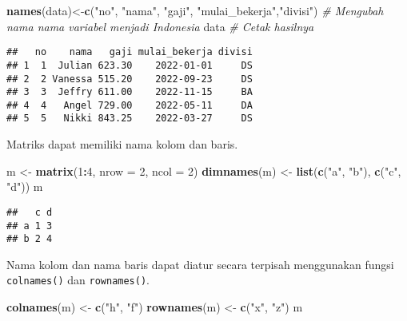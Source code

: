 \documentclass[
]{book}
\newenvironment{Shaded}{\begin{snugshade}}{\end{snugshade}}
\newcommand{\CommentTok}[1]{\textcolor[rgb]{0.56,0.35,0.01}{\textit{#1}}}
\newcommand{\DataTypeTok}[1]{\textcolor[rgb]{0.13,0.29,0.53}{#1}}
\newcommand{\DecValTok}[1]{\textcolor[rgb]{0.00,0.00,0.81}{#1}}
\newcommand{\KeywordTok}[1]{\textcolor[rgb]{0.13,0.29,0.53}{\textbf{#1}}}
\newcommand{\NormalTok}[1]{#1}
\newcommand{\OperatorTok}[1]{\textcolor[rgb]{0.81,0.36,0.00}{\textbf{#1}}}
\newcommand{\StringTok}[1]{\textcolor[rgb]{0.31,0.60,0.02}{#1}}
\begin{document}
\begin{Shaded}
\begin{Highlighting}[]
\KeywordTok{names}\NormalTok{(data)<-}\KeywordTok{c}\NormalTok{(}\StringTok{"no"}\NormalTok{, }\StringTok{"nama"}\NormalTok{, }\StringTok{"gaji"}\NormalTok{,}
             \StringTok{"mulai_bekerja"}\NormalTok{,}\StringTok{"divisi"}\NormalTok{) }\CommentTok{# Mengubah nama nama variabel menjadi Indonesia}
\NormalTok{data                                   }\CommentTok{# Cetak hasilnya}
\end{Highlighting}
\end{Shaded}

\begin{verbatim}
##   no    nama   gaji mulai_bekerja divisi
## 1  1  Julian 623.30    2022-01-01     DS
## 2  2 Vanessa 515.20    2022-09-23     DS
## 3  3  Jeffry 611.00    2022-11-15     BA
## 4  4   Angel 729.00    2022-05-11     DA
## 5  5   Nikki 843.25    2022-03-27     DS
\end{verbatim}

Matriks dapat memiliki nama kolom dan baris.

\begin{Shaded}
\begin{Highlighting}[]
\NormalTok{m <-}\StringTok{ }\KeywordTok{matrix}\NormalTok{(}\DecValTok{1}\OperatorTok{:}\DecValTok{4}\NormalTok{, }\DataTypeTok{nrow =} \DecValTok{2}\NormalTok{, }\DataTypeTok{ncol =} \DecValTok{2}\NormalTok{)}
\KeywordTok{dimnames}\NormalTok{(m) <-}\StringTok{ }\KeywordTok{list}\NormalTok{(}\KeywordTok{c}\NormalTok{(}\StringTok{"a"}\NormalTok{, }\StringTok{"b"}\NormalTok{), }\KeywordTok{c}\NormalTok{(}\StringTok{"c"}\NormalTok{, }\StringTok{"d"}\NormalTok{)) }
\NormalTok{m}
\end{Highlighting}
\end{Shaded}

\begin{verbatim}
##   c d
## a 1 3
## b 2 4
\end{verbatim}

Nama kolom dan nama baris dapat diatur secara terpisah menggunakan fungsi \texttt{colnames()} dan \texttt{rownames()}.

\begin{Shaded}
\begin{Highlighting}[]
\KeywordTok{colnames}\NormalTok{(m) <-}\StringTok{ }\KeywordTok{c}\NormalTok{(}\StringTok{"h"}\NormalTok{, }\StringTok{"f"}\NormalTok{)}
\KeywordTok{rownames}\NormalTok{(m) <-}\StringTok{ }\KeywordTok{c}\NormalTok{(}\StringTok{"x"}\NormalTok{, }\StringTok{"z"}\NormalTok{)}
\NormalTok{m}
\end{Highlighting}
\end{Shaded}
\end{document}
